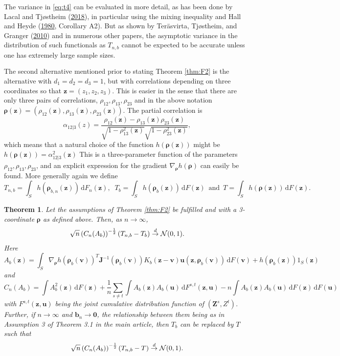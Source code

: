 \documentclass[
  12pt,
  letterpaper]{article}
\newtheorem{thm}{Theorem}[section]
\numberwithin{equation}{section}
\newcommand{\Z}{\bm{Z}}
\newcommand{\z}{\bm{z}}
\newcommand{\fv}{\bm{v}}
\newcommand{\fu}{\bm{u}}
\newcommand{\J}{\bm{J}}
\newcommand{\frho}{\bm{\rho}}
\newcommand{\bb}{\bm{b}}
\newcommand{\di}{\,\textrm{d}}
\begin{document}
The variance in \eqref{eq:t4} can be evaluated in more detail, as has been done by Lacal and Tjøstheim (\protect\hyperlink{ref-lacal2018estimating}{2018}), in particular using the mixing inequality and Hall and Heyde (\protect\hyperlink{ref-hall1980martingale}{1980}, Corollary A2). But as shown by Teräsvirta, Tjøstheim, and Granger (\protect\hyperlink{ref-terasvirta2010modelling}{2010}) and in numerous other papers, the asymptotic variance in the distribution of such functionals as \(T_{n,b}\) cannot be expected to be accurate unless one has extremely large sample sizes.

The second alternative mentioned prior to stating Theorem \ref{thm:F2} is the alternative with \(d_1=d_2=d_3=1\), but with correlations depending on three coordinates so that \(\z=(z_1,z_2,z_3)\). This is easier in the sense that there are only three pairs of correlations, \(\rho_{12}, \rho_{13}, \rho_{23}\) and in the above notation \(\frho(\z) = (\rho_{12}(\z), \rho_{13}(\z), \rho_{23}(\z))\). The partial correlation is
\[
\alpha_{12|3}(z) = \frac{\rho_{12}(\z)-\rho_{13}(\z)\rho_{23}(\z)}{\sqrt{1-\rho_{13}^2(\z)}\sqrt{1-\rho_{23}^2(\z)}},
\]
which means that a natural choice of the function \(h(\frho(\z))\) might be \(h(\frho(\z)) = \alpha_{12|3}^2(\z)\) This is a three-parameter function of the parameters \(\rho_{12}, \rho_{13},\rho_{23}\), and an explicit expression for the gradient \(\nabla_{\frho}h(\frho)\) can easily be found. More generally again we define
\[
T_{n,b} = \int_S h(\frho_{b,n}(\z)) \di F_n(\z),\;\; T_b= \int_S h(\frho_b(\z)) \di F(\z) \, \textrm{ and } \, T = \int_S h(\frho(\z)) \di F(\z).
\]

\begin{thm}
Let the assumptions of Theorem \ref{thm:F2} be fulfilled and with a 3-coordinate $\frho$ as defined above. Then,
as $n \to \infty$,
$$
\sqrt{n}\left(C_{n}(A_b)\right)^{-\frac{1}{2}}(T_{n,b} - T_b) \buildrel {d} \over {\to} {\cal N}(0,1).
$$
Here 
$$
A_b(\z) = \int_S \nabla_{\frho}h(\frho_b(\fv))^{T}{\J}^{-1}(\frho_b(\fv))K_b(\z-\fv)\fu(\z,\frho_b(\fv)) \di F(\fv) + h(\frho_b(\z))1_S(\z)
$$
and 
$$
C_n(A_b) = \int A_b^2(\z) \di F(\z) + \frac{1}{n}\sum_{s \neq t}\int A_b(\z)A_b(\fu) \di F^{s,t}(\z,\fu) - n\int A_b(\z)A_b(\fu) \di F(\z) \di F(\fu)
$$
with $F^{s,t}(\z,\fu)$ being the joint cumulative distribution function of $(\Z^s,Z^t)$. Further, if $n \to \infty$ and $\bb_n \to \bm{0}$, the relationship between them being as in Assumption 3 of Theorem 3.1 in the main article, then $T_b$ can be replaced by $T$ such that
$$
\sqrt{n}\left(C_n(A_b)\right)^{-\frac{1}{2}}(T_{n,b} - T) \buildrel {d} \over {\to} {\cal N}(0,1).
$$
\label{thm:F3}
\end{thm}
\end{document}
